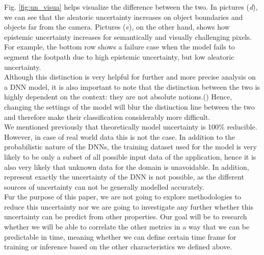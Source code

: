 Fig. \ref{fig:un_visua} helps visualize the difference between the two. In pictures (\textit{d}), we can see that the aleatoric uncertainty increases on object boundaries and objects far from the camera. Pictures (\textit{e}), on the other hand, shows how epistemic uncertainty increases for semantically and visually challenging pixels. For example, the bottom row shows a failure case when the model fails to segment the footpath due to high epistemic uncertainty, but low aleatoric uncertainty. \cite{DBLP:journals/corr/KendallG17}\\
Although this distinction is very helpful for further and more precise analysis on a DNN model, it is also important to note that the distinction between the two is highly dependent on the context: they are not absolute notions.(\cite{KIUREGHIAN2009105}) Hence, changing the settings of the model will blur the distinction line between the two and therefore make their classification considerably more difficult.\cite{Separation_uncer}\\
We mentioned previously that theoretically model uncertainty is 100\% reducible. However, in case of real world data this is not the case. In addition to the probabilistic nature of the DNNs, the training dataset used for the model is very likely to be only a subset of all possible input data of the application, hence it is also very likely that unknown data for the domain is unavoidable. In addition, represent exactly the uncertainty of the DNN is not possible, as the different sources of uncertainty can not be generally modelled accurately. \cite{gawlikowski2021survey}\\

Fur the purpose of this paper, we are not going to explore methodologies to reduce this uncertainty nor we are going to investigate any further whether this uncertainty can be predict from other properties. Our goal will be to research whether we will be able to correlate the other metrics in a way that we can be predictable in time, meaning whether we can define certain time frame for training or inference based on the other characteristics we defined above. 

